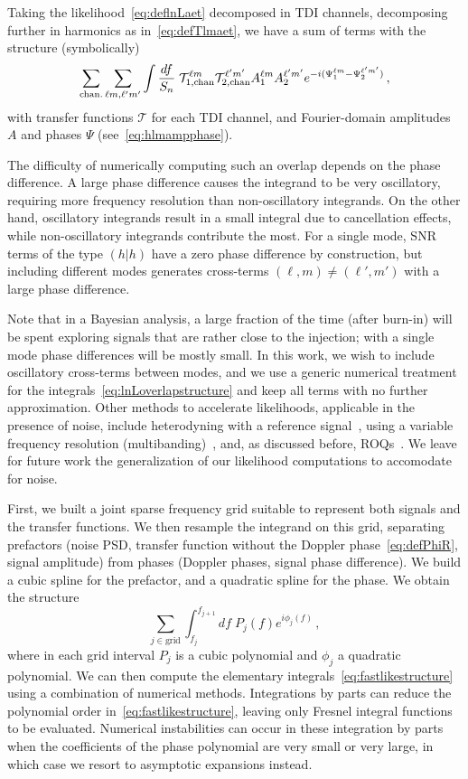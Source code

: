 \documentclass[aps,showpacs,twocolumn,prd,superscriptaddress,nofootinbib]{revtex4-1}
\newcommand{\be}{\begin{equation}}
\newcommand{\ee}{\end{equation}}
\newcommand\calT{{\mathcal{T}}}
\begin{document}
Taking the likelihood~\eqref{eq:deflnLaet} decomposed in TDI channels, decomposing further in harmonics as in~\eqref{eq:defTlmaet}, we have a sum of terms with the structure (symbolically)
\be
	\sum_{\rm chan.}\sum_{\ell m, \ell'm'}\int \frac{df}{S_{n}} \; \calT_{1, \mathrm{chan}}^{\ell m} \calT_{2, \mathrm{chan}}^{\ell' m'} A_{1}^{\ell m} A_{2}^{\ell' m'} e^{-i(\Psi_{1}^{\ell m} - \Psi_{2}^{\ell' m'})} \,,
\ee
with transfer functions $\calT$ for each TDI channel, and Fourier-domain amplitudes $A$ and phases $\Psi$ (see~\eqref{eq:hlmampphase}).

The difficulty of numerically computing such an overlap depends on the phase difference. A large phase difference causes the integrand to be very oscillatory, requiring more frequency resolution than non-oscillatory integrands. On the other hand, oscillatory integrands result in a small integral due to cancellation effects, while non-oscillatory integrands contribute the most. For a single mode, $\mathrm{SNR}$ terms of the type $(h|h)$ have a zero phase difference by construction, but including different modes generates cross-terms $(\ell, m) \neq (\ell', m')$ with a large phase difference.

Note that in a Bayesian analysis, a large fraction of the time (after burn-in) will be spent exploring signals that are rather close to the injection; with a single mode phase differences will be mostly small. In this work, we wish to include oscillatory cross-terms between modes, and we use a generic numerical treatment for the integrals~\eqref{eq:lnLoverlapstructure} and keep all terms with no further approximation. Other methods to accelerate likelihoods, applicable in the presence of noise, include heterodyning with a reference signal~\cite{Cornish10}, using a variable frequency resolution (multibanding)~\cite{Porter14, Vinciguerra+17}, and, as discussed before, ROQs~\cite{Smith+14, Canizares+14, Smith+16}. We leave for future work the generalization of our likelihood computations to accomodate for noise.

First, we built a joint sparse frequency grid suitable to represent both signals and the transfer functions. We then resample the integrand on this grid, separating prefactors (noise PSD, transfer function without the Doppler phase~\eqref{eq:defPhiR}, signal amplitude) from phases (Doppler phases, signal phase difference). We build a cubic spline for the prefactor, and a quadratic spline for the phase. We obtain the structure
\be\label{eq:fastlikestructure}
	\sum_{j \in \mathrm{grid}} \int_{f_{j}}^{f_{j+1}} df \; P_{j} (f) e^{i \phi_{j} (f)} \,,
\ee
where in each grid interval $P_{j}$ is a cubic polynomial and $\phi_{j}$ a quadratic polynomial. We can then compute the elementary integrals~\eqref{eq:fastlikestructure} using a combination of numerical methods. Integrations by parts can reduce the polynomial order in~\eqref{eq:fastlikestructure}, leaving only Fresnel integral functions to be evaluated. Numerical instabilities can occur in these integration by parts when the coefficients of the phase polynomial are very small or very large, in which case we resort to asymptotic expansions instead.
\end{document}
